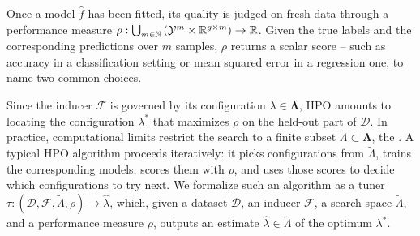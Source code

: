 Once a model \( \hat{f} \) has been fitted, its quality is judged on fresh data through a performance measure \( \rho : \bigcup_{m \in \mathbb{N}} \left( \mathcal{Y}^m \times \mathbb{R}^{g \times m} \right) \to \mathbb{R} \). Given the true labels and the corresponding predictions over \( m \) samples, \( \rho \) returns a scalar score -- such as accuracy in a classification setting or mean squared error in a regression one, to name two common choices.

Since the inducer \( \mathscr{F} \) is governed by its configuration \( \lambda \in \boldsymbol\Lambda \), HPO amounts to locating the configuration \( \lambda^* \) that maximizes \( \rho \) on the held-out part of \( \mathcal{D} \). In practice, computational limits restrict the search to a finite subset \( \tilde{\Lambda} \subset \boldsymbol\Lambda \), the . A typical HPO algorithm proceeds iteratively: it picks configurations from \( \tilde{\Lambda} \), trains the corresponding models, scores them with \( \rho \), and uses those scores to decide which configurations to try next. We formalize such an algorithm as a tuner \( \tau : \left( \mathcal{D}, \mathscr{F}, \tilde{\Lambda}, \rho \right) \to \hat\lambda \), which, given a dataset \( \mathcal{D} \), an inducer \( \mathscr{F} \), a search space \( \tilde{\Lambda} \), and a performance measure \( \rho \), outputs an estimate \( \hat{\lambda} \in \tilde{\Lambda} \) of the optimum \( \lambda^* \).
